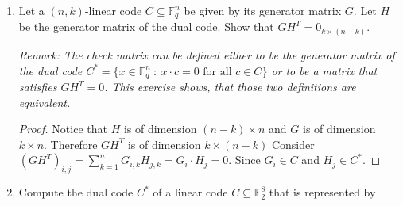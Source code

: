 \documentclass[12pt]{article}
\begin{document}
\begin{enumerate}
\begin{enumerate}
        \begin{proof}
        We solve the equation $M \cdot y^{-1} = 00000001$ through the diagonalization method.
        
        Which yields the following equation $M' y^{-1} = 00000110$ where $M'$ is the following matrix :
        
        $$\begin{array}{c c c c c c c c}
         1 & 0 & 0 & 1 & 1 & 0 & 0 & 1\\
         0 & 1 & 0 & 1 & 0 & 1 & 0 & 1\\
         0 & 0 & 1 & 0 & 1 & 0 & 1 & 0\\
         0 & 0 & 0 & 1 & 0 & 1 & 0 & 1\\
         0 & 0 & 0 & 0 & 1 & 0 & 1 & 0\\
         0 & 0 & 0 & 0 & 0 & 1 & 1 & 0\\
         0 & 0 & 0 & 0 & 0 & 0 & 1 & 1\\
         0 & 0 & 0 & 0 & 0 & 0 & 0 & 1 \\
         \end{array}$$
         
         Therefore $y^{-1} = 10001010$
        \end{proof}
        
        
    \end{enumerate}
    
    \item Let a $(n,k)$-linear code $C \subseteq \mathbb{F}^n_q$ be given by its generator matrix $G$. Let $H$ be the generator matrix of the dual code. Show that $GH^{T} = 0_{k \times (n-k)}$.
    
    \emph{Remark: The check matrix can be defined either to be the generator matrix of the dual code $C^* = \{ x \in \mathbb{F}^n_q \: : \: x \cdot c = 0 \textrm{ for all }c \in C\}$ or to be a matrix that satisfies $GH^{T} = 0$. This exercise shows, that those two definitions are equivalent.}
    
    \begin{proof}
    
    Notice that $H$ is of dimension $(n-k) \times n$ and $G$ is of dimension $k \times n$. Therefore $G H^{T}$ is of dimension $k \times (n-k)$
    Consider $(GH^T)_{i,j} = \displaystyle \sum \limits_{k=1}^n G_{i,k} H_{j,k} = G_i \cdot H_j = 0$. Since $G_i \in C$ and $H_j \in C^*$.
    \end{proof}
    
    \item Compute the dual code $C^*$ of a linear code $C \subseteq \mathbb{F}^8_2$ that is represented by
    

\end{enumerate}
\end{document}
